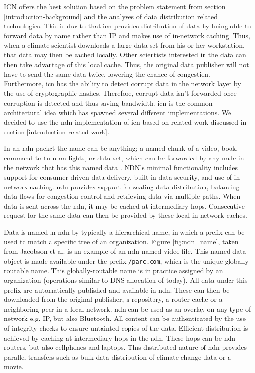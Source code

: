 ICN offers the best solution based on the problem statement from section \ref{introduction-background} and the analyses of data distribution related technologies. This is due to that \gls{icn} provides distribution of data by being able to forward data by name rather than IP and makes use of in-network caching. Thus, when a climate scientist downloads a large data set from his or her workstation, that data may then be cached locally. Other scientists interested in the data can then take advantage of this local cache. Thus, the original data publisher will not have to send the same data twice, lowering the chance of congestion. Furthermore, \gls{icn} has the ability to detect corrupt data in the network layer by the use of cryptographic hashes. Therefore, corrupt data isn't forwarded once corruption is detected and thus saving bandwidth. \gls{icn} is the common architectural idea which has spawned several different implementations. We decided to use the \gls{ndn} \cite{ndn-summary} implementation of \gls{icn} based on related work discussed in section \ref{introduction-related-work}.

\label{overview-ndn}
In an \gls{ndn} packet the name can be anything; a named chunk of a video, book, command to turn on lights, or data set, which can be forwarded by any node in the network that has this named data \cite{ndn-faq}. NDN’s minimal functionality includes support for consumer-driven data delivery, built-in data security, and use of in-network caching. \gls{ndn} provides support for scaling data distribution, balancing data flows for congestion control and retrieving data via multiple paths. When data is sent across the \gls{ndn}, it may be cached at intermediary hops. Consecutive request for the same data can then be provided by these local in-network caches.

Data is named in \gls{ndn} by typically a hierarchical name, in which a prefix can be used to match a specific tree of an organization. Figure \ref{fig:ndn_name}, taken from Jacobson et al. \cite{jacobson2009networking} is an example of an \gls{ndn} named video file. This named data object is made available under the prefix \texttt{/parc.com}, which is the unique globally-routable name. This globally-routable name is in practice assigned by an organization (operations similar to DNS allocation of today). All data under this prefix are automatically published and available in \gls{ndn}. These can then be downloaded from the original publisher, a repository, a router cache or a neighboring peer in a local network. \gls{ndn} can be used as an overlay on any type of network e.g. IP, but also Bluetooth. All content can be authenticated by the use of integrity checks to ensure untainted copies of the data. Efficient distribution is achieved by caching at intermediary hops in the \gls{ndn}. These hops can be \gls{ndn} routers, but also cellphones and laptops. This distributed nature of \gls{ndn} provides parallel transfers such as bulk data distribution of climate change data or a movie.


